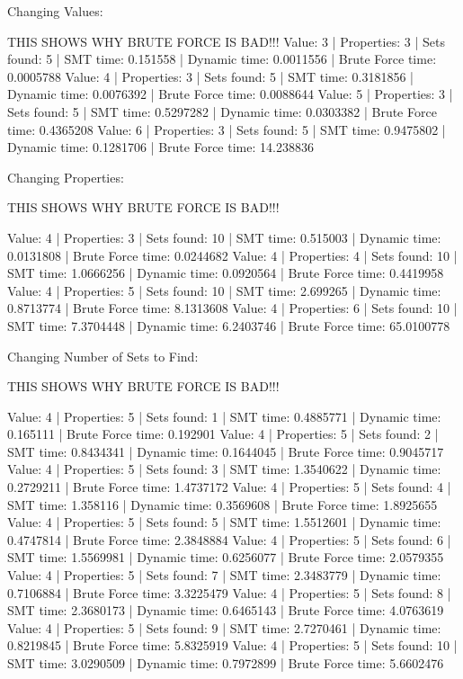 \documentclass[pageno]{jpaper}
\begin{document}
Changing Values:

THIS SHOWS WHY BRUTE FORCE IS BAD!!!
Value: 3 | Properties: 3 | Sets found: 5 | SMT time: 0.151558 | Dynamic time: 0.0011556 | Brute Force time: 0.0005788
Value: 4 | Properties: 3 | Sets found: 5 | SMT time: 0.3181856 | Dynamic time: 0.0076392 | Brute Force time: 0.0088644
Value: 5 | Properties: 3 | Sets found: 5 | SMT time: 0.5297282 | Dynamic time: 0.0303382 | Brute Force time: 0.4365208
Value: 6 | Properties: 3 | Sets found: 5 | SMT time: 0.9475802 | Dynamic time: 0.1281706 | Brute Force time: 14.238836


Changing Properties:


THIS SHOWS WHY BRUTE FORCE IS BAD!!!

Value: 4 | Properties: 3 | Sets found: 10 | SMT time: 0.515003 | Dynamic time: 0.0131808 | Brute Force time: 0.0244682
Value: 4 | Properties: 4 | Sets found: 10 | SMT time: 1.0666256 | Dynamic time: 0.0920564 | Brute Force time: 0.4419958
Value: 4 | Properties: 5 | Sets found: 10 | SMT time: 2.699265 | Dynamic time: 0.8713774 | Brute Force time: 8.1313608
Value: 4 | Properties: 6 | Sets found: 10 | SMT time: 7.3704448 | Dynamic time: 6.2403746 | Brute Force time: 65.0100778



Changing Number of Sets to Find:

THIS SHOWS WHY BRUTE FORCE IS BAD!!!

Value: 4 | Properties: 5 | Sets found: 1 | SMT time: 0.4885771 | Dynamic time: 0.165111 | Brute Force time: 0.192901
Value: 4 | Properties: 5 | Sets found: 2 | SMT time: 0.8434341 | Dynamic time: 0.1644045 | Brute Force time: 0.9045717
Value: 4 | Properties: 5 | Sets found: 3 | SMT time: 1.3540622 | Dynamic time: 0.2729211 | Brute Force time: 1.4737172
Value: 4 | Properties: 5 | Sets found: 4 | SMT time: 1.358116 | Dynamic time: 0.3569608 | Brute Force time: 1.8925655
Value: 4 | Properties: 5 | Sets found: 5 | SMT time: 1.5512601 | Dynamic time: 0.4747814 | Brute Force time: 2.3848884
Value: 4 | Properties: 5 | Sets found: 6 | SMT time: 1.5569981 | Dynamic time: 0.6256077 | Brute Force time: 2.0579355
Value: 4 | Properties: 5 | Sets found: 7 | SMT time: 2.3483779 | Dynamic time: 0.7106884 | Brute Force time: 3.3225479
Value: 4 | Properties: 5 | Sets found: 8 | SMT time: 2.3680173 | Dynamic time: 0.6465143 | Brute Force time: 4.0763619
Value: 4 | Properties: 5 | Sets found: 9 | SMT time: 2.7270461 | Dynamic time: 0.8219845 | Brute Force time: 5.8325919
Value: 4 | Properties: 5 | Sets found: 10 | SMT time: 3.0290509 | Dynamic time: 0.7972899 | Brute Force time: 5.6602476
\end{document}
